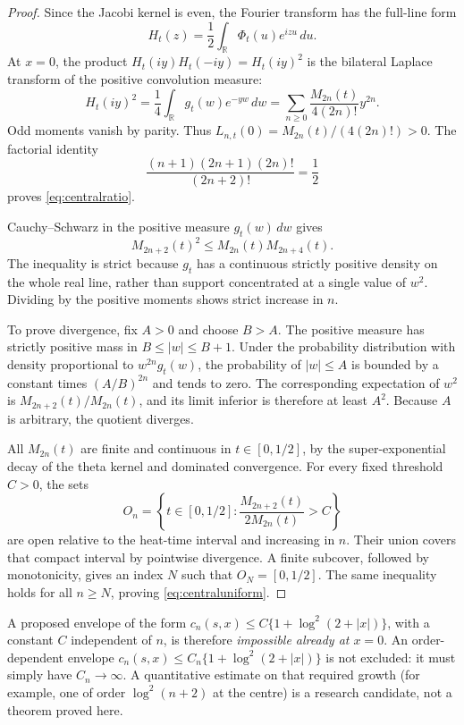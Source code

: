 \begin{proof}
Since the Jacobi kernel is even, the
Fourier transform has the full-line form
\[
H_t(z)=\frac12\int_{\mathbb R}
\Phi_t(u)e^{izu}\,du.
\]
At $x=0$, the product
$H_t(iy)H_t(-iy)=H_t(iy)^2$
is the bilateral Laplace transform of
the positive convolution measure:
\[
H_t(iy)^2=\frac14\int_{\mathbb R}
g_t(w)e^{-yw}\,dw
=\sum_{n\ge0}
\frac{M_{2n}(t)}{4(2n)!}y^{2n}.
\]
Odd moments vanish by parity.
Thus $L_{n,t}(0)=M_{2n}(t)/(4(2n)!)>0$.
The factorial identity
\[
\frac{(n+1)(2n+1)(2n)!}{(2n+2)!}
=\frac12
\]
proves \eqref{eq:centralratio}.

Cauchy--Schwarz in the positive measure
$g_t(w)\,dw$ gives
\[
M_{2n+2}(t)^2\le
M_{2n}(t)M_{2n+4}(t).
\]
The inequality is strict because $g_t$
has a continuous strictly positive density
on the whole real line, rather than
support concentrated at a single value
of $w^2$. Dividing by the positive
moments shows strict increase in $n$.

To prove divergence, fix $A>0$ and choose
$B>A$. The positive measure has strictly
positive mass in $B\le|w|\le B+1$.
Under the probability distribution
with density proportional to
$w^{2n}g_t(w)$, the probability of
$|w|\le A$ is bounded by a constant
times $(A/B)^{2n}$ and tends to zero.
The corresponding expectation of
$w^2$ is
$M_{2n+2}(t)/M_{2n}(t)$, and its
limit inferior is therefore at least
$A^2$. Because $A$ is arbitrary,
the quotient diverges.

All $M_{2n}(t)$ are finite and
continuous in $t\in[0,1/2]$, by the
super-exponential decay of the theta
kernel and dominated convergence.
For every fixed threshold $C>0$,
the sets
\[
O_n=\left\{t\in[0,1/2]:
\frac{M_{2n+2}(t)}{2M_{2n}(t)}>C\right\}
\]
are open relative to the heat-time
interval and increasing in $n$.
Their union covers that compact interval
by pointwise divergence.
A finite subcover, followed by monotonicity,
gives an index $N$ such that
$O_N=[0,1/2]$. The same inequality holds
for all $n\ge N$, proving
\eqref{eq:centraluniform}.
\end{proof}

A proposed envelope of the form
$c_n(s,x)\le C\{1+\log^2(2+|x|)\}$,
with a constant $C$ independent of $n$,
is therefore \emph{impossible already at
$x=0$}. An order-dependent envelope
$c_n(s,x)\le C_n\{1+\log^2(2+|x|)\}$
is not excluded: it must simply have
$C_n\to\infty$. A quantitative estimate
on that required growth (for example,
one of order $\log^2(n+2)$ at the centre)
is a research candidate, not a theorem
proved here.

